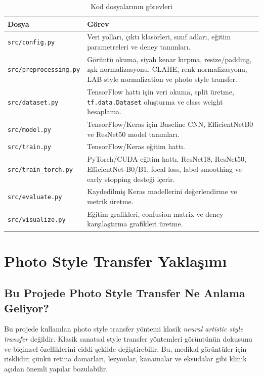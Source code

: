 \documentclass[12pt,a4paper]{article}
\begin{document}
\begin{table}[H]
\centering
\caption{Kod dosyalarının görevleri}
\begin{tabular}{p{4cm}p{10cm}}
\toprule
\textbf{Dosya} & \textbf{Görev} \\
\midrule
\texttt{src/config.py} & Veri yolları, çıktı klasörleri, sınıf adları, eğitim parametreleri ve deney tanımları. \\
\texttt{src/preprocessing.py} & Görüntü okuma, siyah kenar kırpma, resize/padding, ışık normalizasyonu, CLAHE, renk normalizasyonu, LAB style normalization ve photo style transfer. \\
\texttt{src/dataset.py} & TensorFlow hattı için veri okuma, split üretme, \texttt{tf.data.Dataset} oluşturma ve class weight hesaplama. \\
\texttt{src/model.py} & TensorFlow/Keras için Baseline CNN, EfficientNetB0 ve ResNet50 model tanımları. \\
\texttt{src/train.py} & TensorFlow/Keras eğitim hattı. \\
\texttt{src/train\_torch.py} & PyTorch/CUDA eğitim hattı. ResNet18, ResNet50, EfficientNet-B0/B1, focal loss, label smoothing ve early stopping desteği içerir. \\
\texttt{src/evaluate.py} & Kaydedilmiş Keras modellerini değerlendirme ve metrik üretme. \\
\texttt{src/visualize.py} & Eğitim grafikleri, confusion matrix ve deney karşılaştırma grafikleri üretme. \\
\bottomrule
\end{tabular}
\end{table}

\section{Photo Style Transfer Yaklaşımı}

\subsection{Bu Projede Photo Style Transfer Ne Anlama Geliyor?}

Bu projede kullanılan photo style transfer yöntemi klasik \textit{neural artistic style transfer} değildir. Klasik sanatsal style transfer yöntemleri görüntünün dokusunu ve biçimsel özelliklerini ciddi şekilde değiştirebilir. Bu, medikal görüntüler için risklidir; çünkü retina damarları, lezyonlar, kanamalar ve eksüdalar gibi klinik açıdan önemli yapılar bozulabilir.
\end{document}

